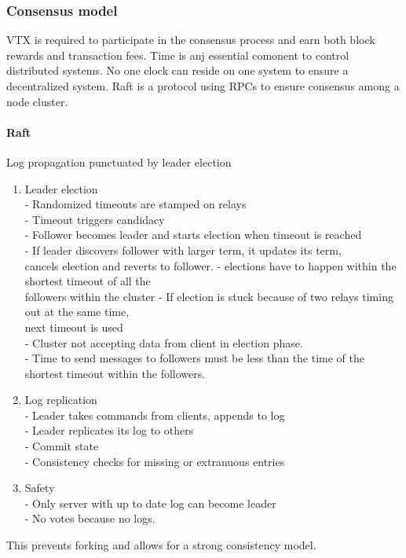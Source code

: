 \documentclass[]{article}
\begin{document}
\subsubsection{Consensus model}
VTX is required to participate in the consensus process and earn both block rewards and transaction fees.
Time is anj essential comonent to control distributed systems.
No one clock can reside on one system to ensure a decentralized system.
Raft is a protocol using RPCs to ensure consensus among a node cluster.\\
\paragraph{Raft}
Log propagation punctuated by leader election\\

%
\begin{enumerate}
	\item Leader election\\
	
	- Randomized timeouts are stamped on relays\\
	- Timeout triggers candidacy\\
	- Follower becomes leader and starts election when timeout is reached\\
	- If leader discovers follower with larger term, it updates its term,\\  cancels election and reverts to follower.
	- elections have to happen within the shortest timeout of all the\\ followers within the cluster
	- If election is stuck because of two relays timing out at the same time,\\ 
	next timeout is used\\
	- Cluster not accepting data from client in election phase.\\
	- Time to send messages to followers must be less than the time
	of the shortest timeout within the followers. 
	
	\item Log replication\\
		- Leader takes commands from clients, appends to log\\
		- Leader replicates its log to others\\
		- Commit state\\
		- Consistency checks for missing or extranuous entries\\
	\item Safety\\
	- Only server with up to date log can become leader\\
	- No votes because no logs.\\
\end{enumerate}
This prevents forking and allows for a strong consistency model.
\end{document}

